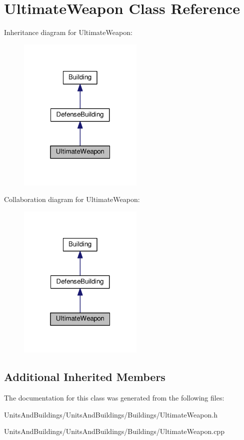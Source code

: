 \hypertarget{class_ultimate_weapon}{}\section{Ultimate\+Weapon Class Reference}
\label{class_ultimate_weapon}


Inheritance diagram for Ultimate\+Weapon\+:
\nopagebreak
\begin{figure}[H]
\begin{center}
\leavevmode
\includegraphics[width=169pt]{class_ultimate_weapon__inherit__graph}
\end{center}
\end{figure}


Collaboration diagram for Ultimate\+Weapon\+:
\nopagebreak
\begin{figure}[H]
\begin{center}
\leavevmode
\includegraphics[width=169pt]{class_ultimate_weapon__coll__graph}
\end{center}
\end{figure}
\subsection*{Additional Inherited Members}


The documentation for this class was generated from the following files\+:\begin{DoxyCompactItemize}
\item 
Units\+And\+Buildings/\+Units\+And\+Buildings/\+Buildings/Ultimate\+Weapon.\+h\item 
Units\+And\+Buildings/\+Units\+And\+Buildings/\+Buildings/Ultimate\+Weapon.\+cpp\end{DoxyCompactItemize}
